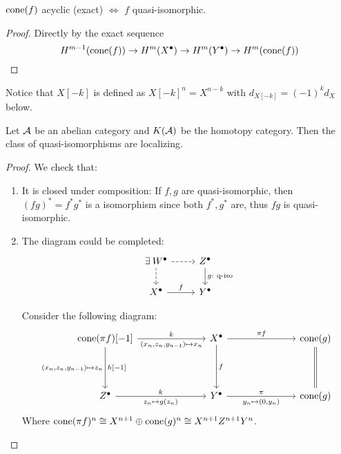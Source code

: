 \begin{coro} \label{coro:cone-exact-iff-quasi-isomorphic}
  $\operatorname{cone}(f)$ acyclic (exact) $\iff$ $f$ quasi-isomorphic.

  \begin{proof}
    Directly by the exact sequence
    \[ H^{m-1}(\operatorname{cone}(f)) \to H^m(X^\bullet) \to H^m(Y^\bullet) \to H^{m}(\operatorname{cone}(f)) \]
  \end{proof}
\end{coro}

Notice that $X[-k]$ is defined as $X[-k]^n = X^{n-k}$ with $d_{X[-k]} = (-1)^k d_X$ below.

\begin{theorem}
  Let $\mathcal{A}$ be an abelian category and $K(\mathcal{A})$ be the homotopy category.
  Then the class of quasi-isomorphisms are localizing.

  \begin{proof}
    We check that:
    \begin{enumerate}
      \item It is closed under composition:
        If $f, g$ are quasi-isomorphic, then $(fg)^* = f^* g^*$ is
        a isomorphism since both $f^*, g^*$ are, thus $fg$ is quasi-isomorphic.
      \item The diagram could be completed:
        \[ \begin{tikzcd}
            \exists W^\bullet \ar[r, dashed] \ar[d, dashed] &
            Z^\bullet \ar[d, "g:\ \text{q-iso}"] \\
            X^\bullet \ar[r, "f"] & Y^\bullet
          \end{tikzcd} \]

        Consider the following diagram:
        \[ \begin{tikzcd}[column sep=2.5cm, row sep=1.5cm]
            \cone(\pi f)[-1] \ar[r, "k", "{(x_n, z_n, y_{n-1}) \mapsto x_n}"']
            \ar[d, "{h[-1]}", "{(x_n, z_n, y_{n-1}) \mapsto z_n}"']
            &
            X^\bullet \ar[r, "\pi f"] \ar[d, "f"] &
            \cone(g) \ar[d, equal]  \\
            Z^\bullet \ar[r, "k", "{z_n \mapsto g(z_n)}"'] &
            Y^\bullet \ar[r, "\pi", "{y_n \mapsto (0, y_n)}"'] &
            \cone(g)
          \end{tikzcd} \]
        Where $\operatorname{cone}(\pi f)^n \cong X^{n+1} \oplus \operatorname{cone}(g)^{n} \cong X^{n+1} Z^{n+1} Y^{n}$.


\end{enumerate}
\end{proof}
\end{theorem}
